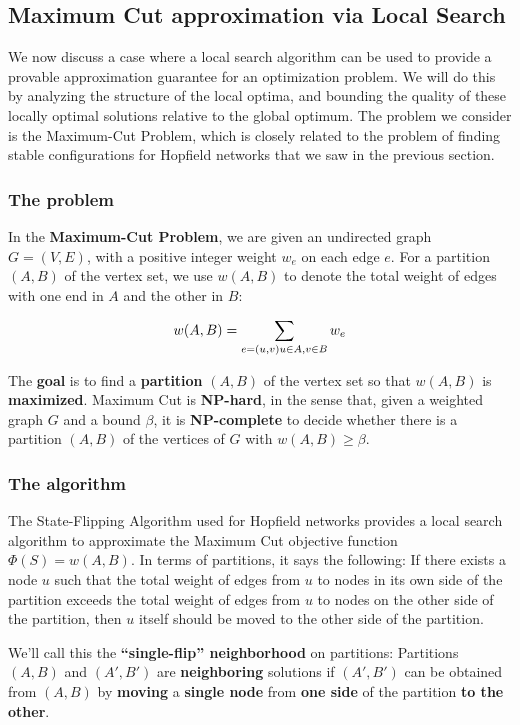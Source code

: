 \subsection{Maximum Cut approximation via Local Search}
We now discuss a case where a local search algorithm can be used to provide a provable approximation guarantee for an optimization problem. We will do this by analyzing the structure of the local optima, and bounding the quality of these locally optimal solutions relative to the global optimum. The problem we consider is the Maximum-Cut Problem, which is closely related to the problem of finding stable configurations for Hopfield networks that we saw in the previous section.

\subsubsection{The problem}
In the \textbf{Maximum-Cut Problem}, we are given an undirected graph $G = (V, E)$, with a positive integer weight $w_e$ on each edge $e$. For a partition $(A, B)$ of the vertex set, we use $w(A, B)$ to denote the total weight of edges with one end in $A$ and the other in $B$:

$$
w(A,B) = \sum_{e = (u,v) \\ u \in A, v \in B} w_e
$$

The \textbf{goal} is to find a \textbf{partition} $(A, B)$ of the vertex set so that $w(A, B)$ is \textbf{maximized}. Maximum Cut is \textbf{NP-hard}, in the sense that, given a weighted graph $G$ and a bound $\beta$, it is \textbf{NP-complete} to decide whether there is a partition $(A, B)$ of the vertices of $G$ with $w(A, B) \geq \beta$. 

\subsubsection{The algorithm}\label{sec4.4.2}
The State-Flipping Algorithm used for Hopfield networks provides a local search algorithm to approximate the Maximum Cut objective function $\Phi(S) = w(A, B)$. In terms of partitions, it says the following: If there exists a node $u$ such that the total weight of edges from $u$ to nodes in its own side of the partition exceeds the total weight of edges from $u$ to nodes on the other side of the partition, then $u$ itself should be moved to the other side of the partition. 

We’ll call this the \textbf{“single-flip” neighborhood} on partitions: Partitions $(A, B)$ and $(A', B')$ are \textbf{neighboring} solutions if $(A', B')$ can be obtained from $(A, B)$ by \textbf{moving} a \textbf{single node} from \textbf{one side} of the partition \textbf{to the other}. 

